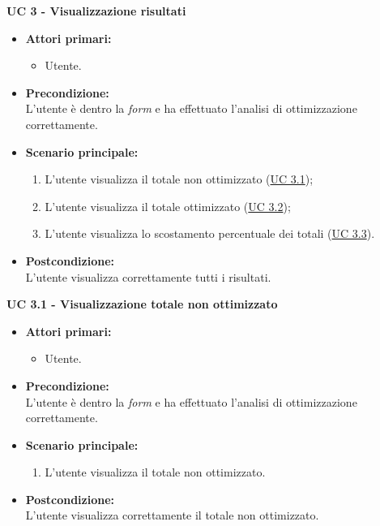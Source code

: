 \noindent \textbf{\large UC 3 - Visualizzazione risultati}
\label{uc:visualizzazione-risultati}
\begin{itemize}

	\item \textbf{Attori primari: }
		\begin{itemize}
			\item Utente.
		\end{itemize}

	\item \textbf{Precondizione: }\\[0.3cm]
		L'utente è dentro la \textit{form} e ha effettuato l'analisi di ottimizzazione correttamente.

	\item \textbf{Scenario principale: }
		\begin{enumerate}
			\item L'utente visualizza il totale non ottimizzato (\hyperref[uc:visualizzazione-totale-non-ottimizzato]{UC 3.1});
			\item L'utente visualizza il totale ottimizzato (\hyperref[uc:visualizzazione-totale-ottimizzato]{UC 3.2});
			\item L'utente visualizza lo scostamento percentuale dei totali (\hyperref[uc:visualizzazione-scostamento-percentuale-totali]{UC 3.3}).
		\end{enumerate}
		

	\item \textbf{Postcondizione: }\\[0.3cm]
		L'utente visualizza correttamente tutti i risultati.

\end{itemize}

\vspace{0.5cm}

\noindent \textbf{\large UC 3.1 - Visualizzazione totale non ottimizzato}
\label{uc:visualizzazione-totale-non-ottimizzato}
\begin{itemize}

	\item \textbf{Attori primari: }
		\begin{itemize}
			\item Utente.
		\end{itemize}

	\item \textbf{Precondizione: }\\[0.3cm]
		L'utente è dentro la \textit{form} e ha effettuato l'analisi di ottimizzazione correttamente.

	\item \textbf{Scenario principale: }
		\begin{enumerate}
			\item L'utente visualizza il totale non ottimizzato.
		\end{enumerate}
		

	\item \textbf{Postcondizione: }\\[0.3cm]
		L'utente visualizza correttamente il totale non ottimizzato.

\end{itemize}


